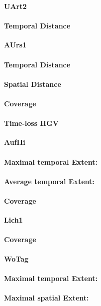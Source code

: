 \begin{table}[ht]
\large
\centerline{\textbf{UArt2}}
\normalsize

\paragraph{Temporal Distance}

\large
\centerline{\textbf{AUrs1}}
\normalsize

\paragraph{Temporal Distance}
\paragraph{Spatial Distance}
\paragraph{Coverage}
\paragraph{Time-loss HGV}

\large
\centerline{\textbf{AufHi}}
\normalsize

\paragraph{Maximal temporal Extent:}
\paragraph{Average temporal Extent:}
\paragraph{Coverage}

\large
\centerline{\textbf{Lich1}}
\normalsize

\paragraph{Coverage}

\large
\centerline{\textbf{WoTag}}
\normalsize

\paragraph{Maximal temporal Extent:}
\paragraph{Maximal spatial Extent:}

\end{table}
